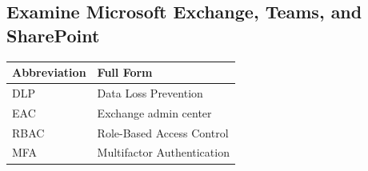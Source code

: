 \documentclass[10pt]{article}
\begin{document}
\subsection{Examine Microsoft Exchange, Teams, and SharePoint}

\begin{center}
\begin{tabular}{>{\raggedright\arraybackslash}p{} >{\raggedright\arraybackslash}p{}}
\toprule
\textbf{Abbreviation} & \textbf{Full Form} \\
\midrule
DLP & Data Loss Prevention \\
EAC & Exchange admin center \\
RBAC & Role-Based Access Control \\
MFA & Multifactor Authentication \\
\end{tabular}
\end{center}
\end{document}
